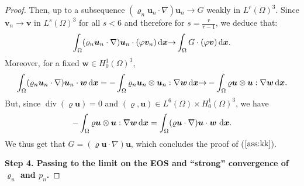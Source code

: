 \documentclass{amsart}
\numberwithin{equation}{section}
\begin{document}
\begin{proof}
Then, up to a subsequence $({\varrho}_n {{\boldsymbol u}}_n \cdot {{\nabla}} ){{\boldsymbol u}}_n {\rightarrow} G$ weakly in $L^r(\Omega)^3$.
Since ${\bm{v}}_n {\rightarrow} {\bm{v}}$ in $L^s(\Omega)^3$ for all $s<6$ and therefore for $s = \frac{r}{r-1}$,
we deduce that:
$$\int_\Omega ({\varrho}_n {{\boldsymbol u}}_n \cdot {{\nabla}} ){{\boldsymbol u}}_n \cdot (\varphi {\bm{v}}_n){\, {\rm d}{{\boldsymbol x}}} {\rightarrow} \int_\Omega G \cdot (\varphi {\bm{v}}){\, {\rm d}{{\boldsymbol x}}}.$$
Moreover, for a fixed $\bm{w} \in H^1_0(\Omega)^3$,
\begin{equation*}
\int_\Omega ({\varrho}_n {{\boldsymbol u}}_n \cdot {{\nabla}} ){{\boldsymbol u}}_n \cdot \bm{w}{\, {\rm d}{{\boldsymbol x}}}= - \int_\Omega {\varrho}_n {{\boldsymbol u}}_n\otimes {{\boldsymbol u}}_n : {{\nabla}} \bm{w} {\, {\rm d}{{\boldsymbol x}}} {\rightarrow}   - \int_\Omega {\varrho} {{\boldsymbol u}} \otimes {{\boldsymbol u}} : {{\nabla}} \bm{w} {\, {\rm d}{{\boldsymbol x}}}.
\end{equation*}
But, since  $ \operatorname{div}({\varrho} {\bm{u}}) =0 $ and $ ({\varrho},{{\boldsymbol u}}) \in L^6(\Omega) \times H_0^1(\Omega)^3 $, we have
\begin{equation*}
- \int_\Omega {\varrho} {{\boldsymbol u}} \otimes {{\boldsymbol u}} : {{\nabla}} \bm{w} {\, {\rm d}{{\boldsymbol x}}} = \int_\Omega ({\varrho} {{\boldsymbol u}} \cdot {{\nabla}} ){{\boldsymbol u}} \cdot \bm{w} \,{\, {\rm d}{{\boldsymbol x}}}.
\end{equation*}
We thus get that $G=({\varrho} {{\boldsymbol u}} \cdot {{\nabla}}) {{\boldsymbol u}}$, which concludes the proof of ($\ref{ass:kk}$).

\bigskip
{\bf Step 4. Passing to the limit on the EOS and ``strong'' convergence of ${\varrho}_n$ and $p_n$.}


\end{proof}
\end{document}
